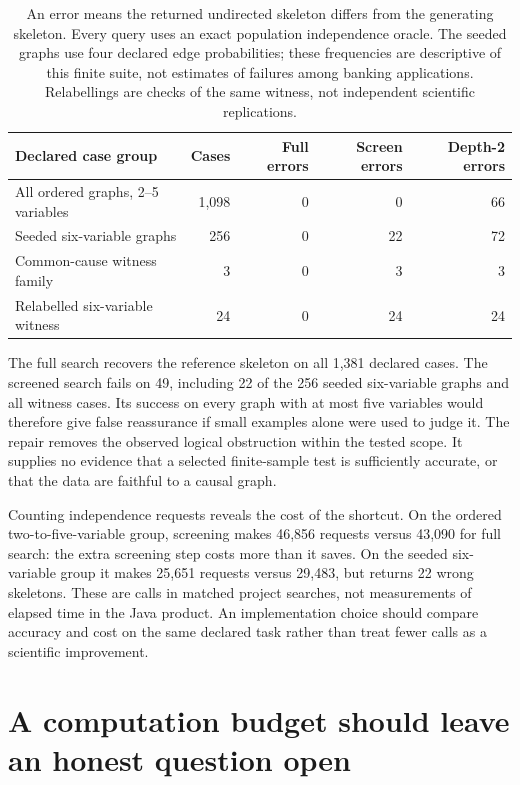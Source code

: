 \begin{table}[htbp]
\centering\small
\begin{tabular}{lrrrr}
\toprule
Declared case group & Cases & Full errors & Screen errors & Depth-2 errors\\
\midrule
All ordered graphs, 2--5 variables & 1,098 & 0 & 0 & 66\\
Seeded six-variable graphs & 256 & 0 & 22 & 72\\
Common-cause witness family & 3 & 0 & 3 & 3\\
Relabelled six-variable witness & 24 & 0 & 24 & 24\\
\bottomrule
\end{tabular}
\caption{An error means the returned undirected skeleton differs from the
generating skeleton. Every query uses an exact population independence
oracle. The seeded graphs use four declared edge probabilities; these
frequencies are descriptive of this finite suite, not estimates of failures
among banking applications. Relabellings are checks of the same witness,
not independent scientific replications.}
\label{repair29:results}
\end{table}

The full search recovers the reference skeleton on all 1,381 declared cases.
The screened search fails on 49, including 22 of the 256 seeded six-variable
graphs and all witness cases. Its success on every graph with at most five
variables would therefore give false reassurance if small examples alone
were used to judge it. The repair removes the observed logical obstruction
within the tested scope. It supplies no evidence that a selected finite-sample
test is sufficiently accurate, or that the data are faithful to a causal graph.

Counting independence requests reveals the cost of the shortcut. On the
ordered two-to-five-variable group, screening makes 46,856 requests versus
43,090 for full search: the extra screening step costs more than it saves.
On the seeded six-variable group it makes 25,651 requests versus 29,483,
but returns 22 wrong skeletons. These are calls in matched project searches,
not measurements of elapsed time in the Java product. An implementation
choice should compare accuracy and cost on the same declared task rather
than treat fewer calls as a scientific improvement.

\section{A computation budget should leave an honest question open}

